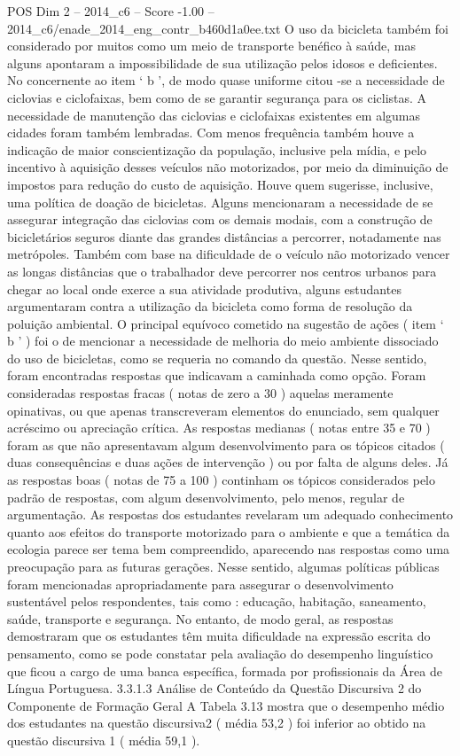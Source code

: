 \begin{textsample}{POS Dim 2 – 2014\_c6 – Score -1.00 – 2014\_c6/enade\_2014\_eng\_contr\_b460d1a0ee.txt}
O uso da bicicleta também foi considerado por muitos como um meio de transporte benéfico à saúde, mas alguns apontaram a impossibilidade de sua utilização pelos idosos e deficientes.
No concernente ao item ‘ b ’, de modo quase uniforme citou -se a necessidade de ciclovias e ciclofaixas, bem como de se garantir segurança para os ciclistas.
A necessidade de manutenção das ciclovias e ciclofaixas existentes em algumas cidades foram também lembradas.
Com menos frequência também houve a indicação de maior conscientização da população, inclusive pela mídia, e pelo incentivo à aquisição desses veículos não motorizados, por meio da diminuição de impostos para redução do custo de aquisição.
Houve quem sugerisse, inclusive, uma política de doação de bicicletas.
Alguns mencionaram a necessidade de se assegurar integração das ciclovias com os demais modais, com a construção de bicicletários seguros diante das grandes distâncias a percorrer, notadamente nas metrópoles.
Também com base na dificuldade de o veículo não motorizado vencer as longas distâncias que o trabalhador deve percorrer nos centros urbanos para chegar ao local onde exerce a sua atividade produtiva, alguns estudantes argumentaram contra a utilização da bicicleta como forma de resolução da poluição ambiental.
O principal equívoco cometido na sugestão de ações ( item ‘ b ’ ) foi o de mencionar a necessidade de melhoria do meio ambiente dissociado do uso de bicicletas, como se requeria no comando da questão.
Nesse sentido, foram encontradas respostas que indicavam a caminhada como opção.
Foram consideradas respostas fracas ( notas de zero a 30 ) aquelas meramente opinativas, ou que apenas transcreveram elementos do enunciado, sem qualquer acréscimo ou apreciação crítica.
As respostas medianas ( notas entre 35 e 70 ) foram as que não apresentavam algum desenvolvimento para os tópicos citados ( duas consequências e duas ações de intervenção ) ou por falta de alguns deles.
Já as respostas boas ( notas de 75 a 100 ) continham os tópicos considerados pelo padrão de respostas, com algum desenvolvimento, pelo menos, regular de argumentação.
As respostas dos estudantes revelaram um adequado conhecimento quanto aos efeitos do transporte motorizado para o ambiente e que a temática da ecologia parece ser tema bem compreendido, aparecendo nas respostas como uma preocupação para as futuras gerações.
Nesse sentido, algumas políticas públicas foram mencionadas apropriadamente para assegurar o desenvolvimento sustentável pelos respondentes, tais como : educação, habitação, saneamento, saúde, transporte e segurança.
No entanto, de modo geral, as respostas demostraram que os estudantes têm muita dificuldade na expressão escrita do pensamento, como se pode constatar pela avaliação do desempenho linguístico que ficou a cargo de uma banca específica, formada por profissionais da Área de Língua Portuguesa. 3.3.1.3 Análise de Conteúdo da Questão Discursiva 2 do Componente de Formação Geral A Tabela 3.13 mostra que o desempenho médio dos estudantes na questão discursiva2 ( média 53,2 ) foi inferior ao obtido na questão discursiva 1 ( média 59,1 ).

\end{textsample}
